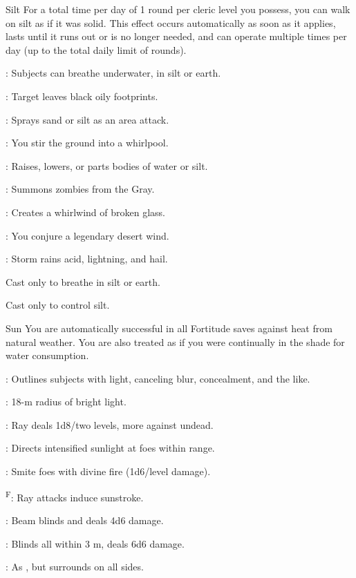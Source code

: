 {Silt}
{For a total time per day of 1 round per cleric level you possess, you can walk on silt as if it was solid. This effect occurs automatically as soon as it applies, lasts until it runs out or is no longer needed, and can operate multiple times per day (up to the total daily limit of rounds).}
{
	\item {}\footnotemark[1]: Subjects can breathe underwater, in silt or earth.
	\item {}: Target leaves black oily footprints.
	\item {}: Sprays sand or silt as an area attack.
	\item {}: You stir the ground into a whirlpool.
	\item {}\footnotemark[2]: Raises, lowers, or parts bodies of water or silt.
	\item {}: Summons zombies from the Gray.
	\item {}: Creates a whirlwind of broken glass.
	\item {}: You conjure a legendary desert wind.
	\item {}: Storm rains acid, lightning, and hail.
}
 Cast only to breathe in silt or earth.

 Cast only to control silt.

{Sun}
{You are automatically successful in all Fortitude saves against heat from natural weather. You are also treated as if you were continually in the shade for water consumption.}
{
	\item {}: Outlines subjects with light, canceling blur, concealment, and the like.
	\item {}: 18-m radius of bright light.
	\item {}: Ray deals 1d8/two levels, more against undead.
	\item {}: Directs intensified sunlight at foes within range.
	\item {}: Smite foes with divine fire (1d6/level damage).
	\item {}\textsuperscript{F}: Ray attacks induce sunstroke.
	\item {}: Beam blinds and deals 4d6 damage.
	\item {}: Blinds all within 3 m, deals 6d6 damage.
	\item {}: As , but surrounds on all sides.
}

